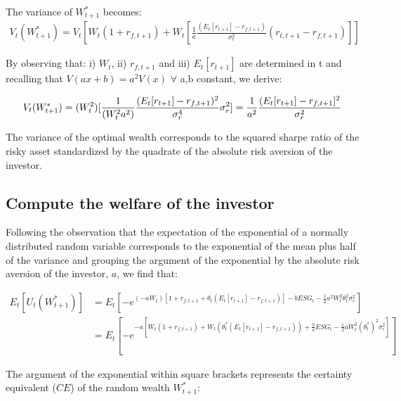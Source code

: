 \documentclass[12pt]{article}
\begin{document}
	The variance of $W_{t+1}^{*}$ becomes:
	\begin{align*}
		V_{t}(W_{t+1}^{*}) = V_{t}[W_t(1 + r_{f,t+1}) + W_t[\frac{1}{a}\frac{(E_{t}[r_{t+1}]-r_{f, t+1})}{\sigma_r^{2}}(r_{t,t+1}-r_{f, t+1})]]
	\end{align*} \vspace{-1em}
	
	By observing that: i) $W_t$, ii) $r_{f,t+1}$ and iii) $E_{t}[r_{t+1}]$ are determined in t and recalling that $V(ax + b) = a^2V(x)$ $\forall$ a,b constant, we derive: \vspace{-0.5em}
	
	\begin{equation} %
		V_{t}(W_{t+1}^{*}) = (W_t^2)[\frac{1}{(W_t^2a^2)}\frac{(E_{t}[r_{t+1}]-r_{f, t+1})^2}{\sigma_r^4}\sigma_r^2] \\
		=\frac{1}{a^2}\frac{(E_{t}[r_{t+1}]-r_{f, t+1}]^2}{\sigma_r^2}
	\end{equation}
	
	The variance of the optimal wealth corresponds to the squared sharpe ratio of the risky asset standardized by the quadrate of the absolute risk aversion of the investor.
	
	\subsection{Compute the welfare of the investor}
	
	Following the observation that the expectation of the exponential of a normally distributed random variable corresponds to the exponential of the mean plus half of the variance and grouping the argument of the exponential by the absolute risk aversion of the investor, $a$, we find that: \vspace{-1em}
	
	\begin{align*}
		E_t[U_{t}(W_{t+1}^{*})] &= E_t[-e^{(-aW_t) [1 + r_{f,t+1} + \theta_t(E_{t}[r_{t+1}]-r_{f, t+1})] - bESG_t - \frac{1}{2}a^2W_t^2\theta_t^2\sigma_r^2}] \\
		&= E_t[-e^{-a [W_t(1 + r_{f,t+1}) + W_t(\theta_t^*(E_{t}[r_{t+1}]-r_{f, t+1})) + \frac{b}{a}ESG_t - \frac{1}{2}aW_t^2(\theta_t^{*})^2\sigma_r^2]}]
	\end{align*}
	
	The argument of the exponential within square brackets represents the certainty equivalent ($CE$) of the random wealth $W_{t+1}^{*}$: \vspace{-1em}
	
\end{document}
